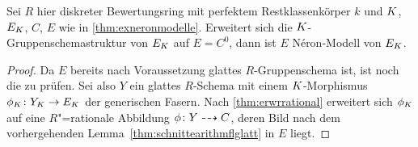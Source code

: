 \begin{Satz}\label{thm:fallstriktehenselisierung}
  Sei $R$ hier %
  diskreter Bewertungsring mit
  perfektem Restklassenkörper $k$
  und $K$, $E_{K}$, $C$, $E$ wie in \ref{thm:exneronmodelle}.
  Erweitert sich die $K$-Gruppenschemastruktur von $E_{K}$ auf
  $E=C^0$, dann ist $E$ Néron-Modell von $E_{K}$.
  \begin{proof}
    Da $E$ bereits nach Voraussetzung glattes $R$-Gruppenschema ist,
    ist noch die \NAbbEig zu prüfen.
    Sei also $Y$ ein glattes $R$-Schema mit einem $K$-Morphismus
    $\phi_{K}\colon Y_{K}\to E_{K}$ der generischen Fasern.
    Nach \ref{thm:erwrrational} erweitert sich $\phi_{K}$ auf eine
    $R$"=rationale Abbildung ${\phi\colon Y\dashrightarrow C}$, deren Bild nach dem
    vorhergehenden Lemma~\ref{thm:schnittearithmflglatt} in $E$
    liegt.
    

\end{proof}
\end{Satz}
